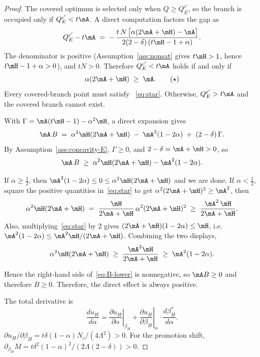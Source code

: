 \begin{proof}
\medskip
The covered optimum is selected only when $Q\ge Q^{c'}_E$, so the
branch is occupied only if $Q^{c'}_E<t\mA$. A direct computation factors the gap as
\[
    Q^{c'}_E - t\mA
    \;=\; -\,\frac{t\,N\,\bigl[\alpha(2\mA+\mH)-\mA\bigr]}{2(2-\delta)\,(t\mH-1+\alpha)} .
\]
The denominator is positive (Assumption~\ref{ass:nonsat} gives $t\mH>1$, hence $t\mH-1+\alpha>0$),
and $tN>0$. Therefore $Q^{c'}_E<t\mA$ holds if and only if
\begin{equation}\label{eq:star}
    \alpha(2\mA+\mH)\;\ge\;\mA. \tag{$\star$}
\end{equation}
Every covered-branch point must satisfy ~\eqref{eq:star}. Otherwise, $Q_E^{\sf c'}>t\mA$ and the covered branch cannot exist.

\medskip
With $\Gamma=\mA(t\mH-1)-\alpha^2\mH$, a direct expansion gives
\[
    \mA\,B
    \;=\; \alpha^2\mH(2\mA+\mH)\;-\;\mA^2(1-2\alpha)\;+\;(2-\delta)\,\Gamma .
\]
By Assumption~\ref{ass:concavity-E}, $\Gamma\ge 0$, and $2-\delta=\mA+\mH>0$, so
\begin{equation}\label{eq:B-lower}
    \mA\,B \;\ge\; \alpha^2\mH(2\mA+\mH)-\mA^2(1-2\alpha).
\end{equation}

\medskip
If $\alpha\ge \tfrac12$, then $\mA^2(1-2\alpha)\le 0\le \alpha^2\mH(2\mA+\mH)$ and we are done.
If $\alpha<\tfrac12$, square the positive quantities in~\eqref{eq:star} to get
$\alpha^2(2\mA+\mH)^2\ge\mA^2$, then
\[
    \alpha^2\mH(2\mA+\mH)
    \;=\; \frac{\mH}{2\mA+\mH}\,\alpha^2(2\mA+\mH)^2
    \;\ge\; \frac{\mA^2\,\mH}{2\mA+\mH}.
\]
Also, multiplying~\eqref{eq:star} by $2$ gives $(2\mA+\mH)(1-2\alpha)\le \mH$, i.e.
$\mA^2(1-2\alpha)\le \mA^2\mH/(2\mA+\mH)$. Combining the two displays,
\[
    \alpha^2\mH(2\mA+\mH)\;\ge\;\frac{\mA^2\mH}{2\mA+\mH}\;\ge\;\mA^2(1-2\alpha).
\]

\medskip
Hence the right-hand side of~\eqref{eq:B-lower} is nonnegative, so $\mA B\ge 0$ and therefore
$B\ge 0$. Therefore, the direct effect is always positive.


The total derivative is
\[
\frac{du_H}{d\alpha}
= \left.\frac{\partial u_H}{\partial\alpha}\right|_{\beta_H}
+ \left.\frac{\partial u_H}{\partial\beta_H}\right|_{\alpha} \cdot \frac{d\beta_H^*}{d\alpha}.
\]
$\partial u_H/\partial\beta_H = t\delta(1-\alpha)N_c/(4\Lambda^2) > 0$.  For the promotion shift, $\partial_{\beta_H}M =t\delta^2(1-\alpha)^2/(2\Lambda (2-\delta)) > 0$.


\end{proof}
